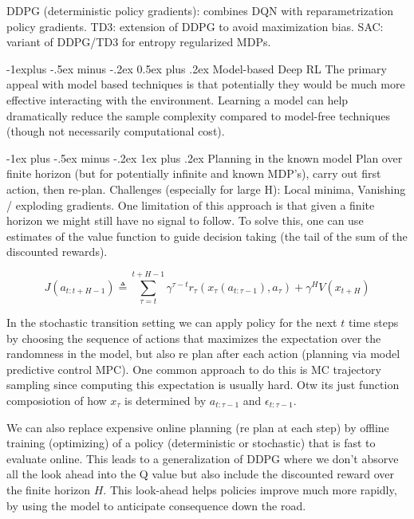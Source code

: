 \documentclass[a4paper, 11pt, twoside, landscape]{article}
\makeatletter
\renewcommand{\subsection}{\@startsection{subsection}{2}{0mm}%
                                {-1explus -.5ex minus -.2ex}%
                                {0.5ex plus .2ex}%
                                {\normalfont\normalsize\bfseries}}
\renewcommand{\subsubsection}{\@startsection{subsubsection}{3}{0mm}%
                                {-1ex plus -.5ex minus -.2ex}%
                                {1ex plus .2ex}%
                                {\normalfont\small\bfseries}}
\makeatother
\begin{document}
\begin{multicols}{3}
DDPG (deterministic policy gradients): combines DQN with reparametrization policy gradients. TD3: extension of DDPG to avoid maximization bias. SAC: variant of DDPG/TD3 for entropy regularized MDPs.

\subsection{Model-based Deep RL}
The primary appeal with model based techniques is that potentially they would be much more effective interacting with the environment. Learning a model can help dramatically reduce the sample complexity compared to model-free techniques (though not necessarily computational cost).

\subsubsection{Planning in the known model}
Plan over finite horizon (but for potentially infinite and known MDP's), carry out first action, then re-plan. Challenges (especially for large H): Local minima, Vanishing / exploding gradients. One limitation of this approach is that given a finite horizon we might still have no signal to follow. To solve this, one can use estimates of the value function to guide decision taking (the tail of the sum of the discounted rewards). 

$$
J(a_{t:t+H-1}) \triangleq \sum_{\tau = t}^{t+H-1} \gamma^{\tau - t}r_{\tau}(x_{\tau}(a_{t:\tau-1}), a_{\tau}) + \gamma^H V(x_{t+H})
$$

In the stochastic transition setting we can apply policy for the next $t$ time steps by choosing the sequence of actions that maximizes the expectation over the randomness in the model, but also re plan after each action (planning via model predictive control MPC). One common approach to do this is MC trajectory sampling since computing this expectation is usually hard. Otw its just function composiotion of how $x_{\tau}$ is determined by $a_{t:\tau-1}$ and $\epsilon_{t:\tau-1}$.

We can also replace expensive online planning (re plan at each step) by offline training (optimizing) of a policy (deterministic or stochastic) that is fast to evaluate online. This leads to a generalization of DDPG where we don't absorve all the look ahead into the Q value but also include the discounted reward over the finite horizon $H$. This look-ahead helps policies improve much more rapidly, by using the model to anticipate consequence down the road. 


\end{multicols}
\end{document}
